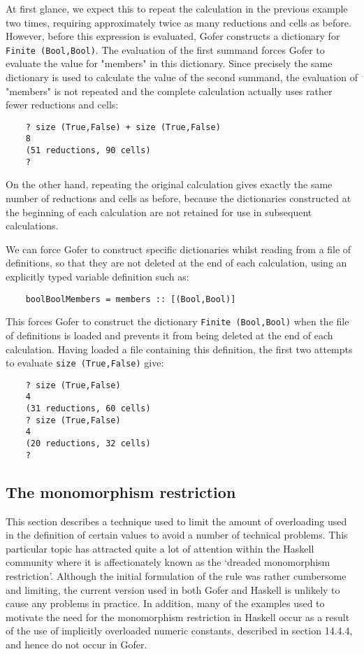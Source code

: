 At first glance, we expect  this  to  repeat  the  calculation  in  the
previous example two  times,  requiring  approximately  twice  as  many
reductions and cells as before.  However,  before  this  expression  is
evaluated, Gofer constructs a dictionary for \verb"Finite (Bool,Bool)". The
evaluation of the first summand forces Gofer to evaluate the value  for
"members" in this dictionary.  Since precisely the same  dictionary  is
used to calculate the value of the second summand,  the  evaluation  of
"members" is not repeated and the complete  calculation  actually  uses
rather fewer reductions and cells:
\begin{verbatim}
    ? size (True,False) + size (True,False)
    8
    (51 reductions, 90 cells)
    ?
\end{verbatim}
On the other hand, repeating the original calculation gives exactly the
same number of reductions and cells as before, because the dictionaries
constructed at the beginning of each calculation are not  retained  for
use in subsequent calculations.

We can force Gofer to construct specific  dictionaries  whilst  reading
from a file of definitions, so that they are not deleted at the end  of
each calculation, using an explicitly typed  variable  definition  such
as:
\begin{verbatim}
    boolBoolMembers = members :: [(Bool,Bool)]
\end{verbatim}
This forces Gofer to construct the dictionary \verb"Finite (Bool,Bool)"  when
the file of definitions is loaded and prevents it from being deleted at
the end of each calculation.  Having  loaded  a  file  containing  this
definition, the  first two  attempts  to  evaluate  \verb"size (True,False)"
give:
\begin{verbatim}
    ? size (True,False)
    4
    (31 reductions, 60 cells)
    ? size (True,False)
    4
    (20 reductions, 32 cells)
    ?
\end{verbatim}

\subsection{The monomorphism restriction}
This section  describes  a  technique  used  to  limit  the  amount  of
overloading used in the definition of certain values to avoid a  number
of technical problems.  This particular topic has attracted quite a lot
of attention within the Haskell community where  it  is  affectionately
known as the `dreaded monomorphism restriction'.  Although the  initial
formulation of the rule was rather cumbersome and limiting, the current
version used in both  Gofer  and  Haskell  is  unlikely  to  cause  any
problems in practice.  In  addition,  many  of  the  examples  used  to
motivate the need for the monomorphism restriction in Haskell occur  as
a result  of  the  use  of  implicitly  overloaded  numeric  constants,
described in section 14.4.4, and hence do not occur in Gofer.

